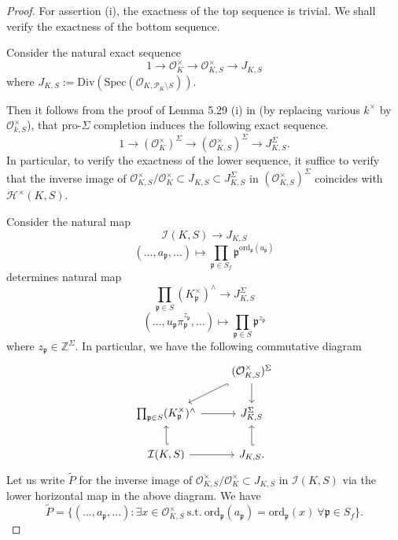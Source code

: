 \documentclass{article}
\theoremstyle{plain}
\theoremstyle{definition}
\theoremstyle{remark}
\begin{document}
\begin{proof}
For assertion (i), the exactness of the top sequence is trivial. We shall verify the exactness of the bottom sequence. \par 
Consider the natural exact sequence
$$
1 \to \mathcal{O}_K^{\times} \to \mathcal{O}_{K,S}^{\times} \to J_{K,S}
$$
where $J_{K,S} := \text{Div}(\text{Spec}(\mathcal{O}_{K,\mathscr{P}_K \setminus S}))$. \par
Then it follows from the proof of Lemma 5.29 (i) in \cite{Ho4} (by replacing various $k^{\times}$ by $\mathcal{O}_{k,S}^{\times}$), that pro-$\Sigma$ completion induces the following exact sequence.
$$
1 \to (\mathcal{O}_{K}^{\times})^{\Sigma} \to (\mathcal{O}_{K,S}^{\times})^{\Sigma} \to J_{K,S}^{\Sigma}.
$$
In particular, to verify the exactness of the lower sequence, it suffice to verify that the inverse image of $\mathcal{O}_{K,S}^{\times}/\mathcal{O}_{K}^{\times} \subset J_{K,S} \subset J_{K,S}^{\Sigma}$ in $(\mathcal{O}^{\times}_{K,S})^{\Sigma}$ coincides with $\mathcal{H}^{\times}(K,S)$. \par 
Consider the natural map
$$
\mathcal{I}(K,S) \to J_{K,S}
$$
$$
(\dots,a_{\mathfrak{p}},\dots) \mapsto \prod_{\mathfrak{p} \in S_f} \mathfrak{p}^{\text{ord}_{\mathfrak{p}}(a_{\mathfrak{p}})}
$$
determines natural map
$$
\prod_{\mathfrak{ p} \in S} (K_{\mathfrak{p}}^{\times})^{\wedge} \to J_{K,S}^{\Sigma}
$$
$$
(\dots,u_{\mathfrak{p}}\pi_{\mathfrak{p}}^{z_{\mathfrak{p}}},\dots) \mapsto \prod_{\mathfrak{p} \in S} \mathfrak{p}^{z_{\mathfrak{p}}}
$$
where $z_{\mathfrak{p}} \in \mathbb Z^{\Sigma}$. In particular, we have the following commutative diagram
$$
\begin{tikzcd}
	& {(\mathcal{O}^{\times}_{K,S})^{\Sigma}} \\
	{\prod_{\mathfrak{p}\in S}(K_{\mathfrak{p}}^{\times})^{\wedge}} & {J_{K,S}^{\Sigma}} \\
	{\mathcal{I}({K,S})} & {J_{K,S}}.
	\arrow[hook, from=1-2, to=2-1]
	\arrow[from=1-2, to=2-2]
	\arrow[from=2-1, to=2-2]
	\arrow[hook', from=3-1, to=2-1]
	\arrow[from=3-1, to=3-2]
	\arrow[hook', from=3-2, to=2-2]
\end{tikzcd}
$$
Let us write $\widetilde{P}$ for the inverse image of $\mathcal{O}_{K,S}^{\times}/\mathcal{O}_K^{\times} \subset J_{K,S}$ in $\mathcal{I}(K,S)$ via the lower horizontal map in the above diagram. We have
$$
\widetilde{P} = \{(\dots,a_{\mathfrak{p}},\dots): \exists x \in \mathcal{O}_{K,S}^{\times}~\text{s.t.}~\text{ord}_{\mathfrak{p}}(a_{\mathfrak{p}}) = \text{ord}_{\mathfrak{p}}(x)~\forall \mathfrak{p} \in S_f\}.
$$
\end{proof}
\end{document}
